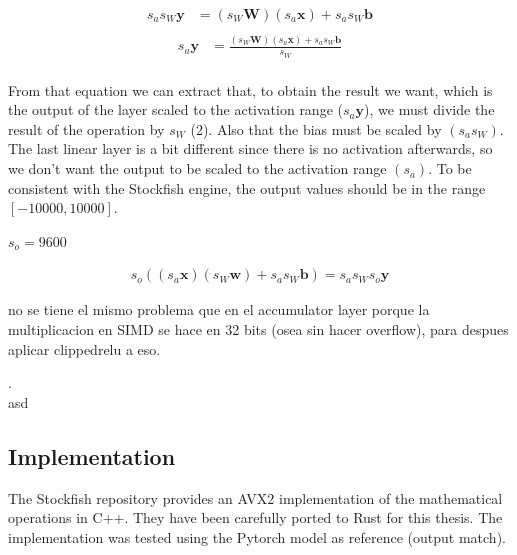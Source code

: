 \begin{equation}
\begin{aligned}
s_a s_W \bm{y} &= (s_W \bm{W}) (s_a \bm{x}) + s_a s_W \bm{b} \\
\end{aligned}
\end{equation}
\begin{equation}
\begin{aligned}
s_a \bm{y} &= \frac{(s_W \bm{W}) (s_a \bm{x}) + s_a s_W \bm{b}}{s_W} \\
\end{aligned}
\end{equation}

From that equation we can extract that, to obtain the result we want, which is the output of the layer scaled to the activation range ($s_a \bm{y}$), we must divide the result of the operation by $s_W$ (2). Also that the bias must be scaled by $(s_a s_W)$. \\

The last linear layer is a bit different since there is no activation afterwards, so we don't want the output to be scaled to the activation range $(s_a)$. To be consistent with the Stockfish engine, the output values should be in the range $[-10000,10000]$.




$s_o=9600$

\begin{equation}
\begin{aligned}
s_o ((s_a \bm{x}) (s_W \bm{w}) + s_a s_W \bm{b}) = s_a s_W s_o \bm{y}
\end{aligned}
\end{equation}







no se tiene el mismo problema que en el accumulator layer porque la multiplicacion en SIMD se hace en 32 bits (osea sin hacer overflow), para despues aplicar clippedrelu a eso.

. \\

asd

\subsection{Implementation}

The Stockfish repository provides an AVX2 implementation of the mathematical operations in C++. They have been carefully ported to Rust for this thesis. The implementation was tested using the Pytorch model as reference (output match).


